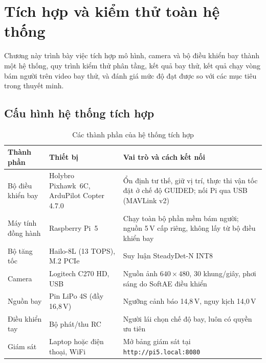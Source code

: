 \chapter{Tích hợp và kiểm thử toàn hệ thống}
\label{chap:tichhop}

Chương này trình bày việc tích hợp mô hình, camera và bộ điều khiển bay thành một hệ thống, quy trình kiểm thử phân tầng, kết quả bay thử, kết quả chạy vòng bám người trên video bay thử, và đánh giá mức độ đạt được so với các mục tiêu trong thuyết minh.

\section{Cấu hình hệ thống tích hợp}

\begin{table}[H]
\centering
\caption{Các thành phần của hệ thống tích hợp}
\label{tab:phancung}
\small
\renewcommand{\arraystretch}{1.15}
\begin{tabularx}{\textwidth}{@{}l>{\raggedright\arraybackslash}p{4.6cm}>{\raggedright\arraybackslash}X@{}}
\toprule
\textbf{Thành phần} & \textbf{Thiết bị} & \textbf{Vai trò và cách kết nối}\\
\midrule
Bộ điều khiển bay & Holybro Pixhawk~6C, ArduPilot Copter 4.7.0 & Ổn định tư thế, giữ vị trí, thực thi vận tốc đặt ở chế độ GUIDED; nối Pi qua USB (MAVLink v2)\\
Máy tính đồng hành & Raspberry Pi~5 & Chạy toàn bộ phần mềm bám người; nguồn 5\,V cấp riêng, không lấy từ bộ điều khiển bay\\
Bộ tăng tốc & Hailo-8L (13 TOPS), M.2 PCIe & Suy luận SteadyDet-N INT8\\
Camera & Logitech C270 HD, USB & Nguồn ảnh $640\times480$, 30 khung/giây, phơi sáng do SoftAE điều khiển\\
Nguồn bay & Pin LiPo 4S (đầy 16,8\,V) & Ngưỡng cảnh báo 14,8\,V, nguy kịch 14,0\,V\\
Điều khiển tay & Bộ phát/thu RC & Người lái chọn chế độ bay, luôn có quyền ưu tiên\\
Giám sát & Laptop hoặc điện thoại, WiFi & Mở bảng giám sát tại \texttt{http://pi5.local:8080}\\
\bottomrule
\end{tabularx}
\end{table}

